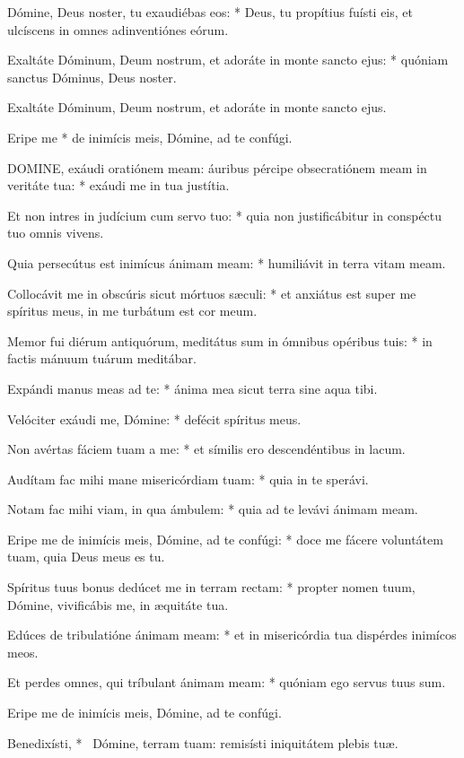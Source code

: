 Dómine, Deus noster, tu exaudiébas eos: * Deus, tu propítius fuísti eis, et ulcíscens in omnes adinventiónes eórum.

Exaltáte Dóminum, Deum nostrum, et adoráte in monte sancto ejus: * quóniam sanctus Dóminus, Deus noster.

 Exaltáte Dóminum, Deum nostrum, et adoráte in monte sancto ejus.

 Eripe me * de inimícis meis, Dómine, ad te confúgi.


\lettrine[lines=2]{D}{OMINE}, exáudi oratiónem meam: áuribus pércipe obsecratiónem meam in veritáte tua: * exáudi me in tua justítia.

Et non intres in judícium cum servo tuo: * quia non justificábitur in conspéctu tuo omnis vivens.

Quia persecútus est inimícus ánimam meam: * humiliávit in terra vitam meam.

Collocávit me in obscúris sicut mórtuos sæculi: * et anxiátus est super me spíritus meus, in me turbátum est cor meum.

Memor fui diérum antiquórum, meditátus sum in ómnibus opéribus tuis: * in factis mánuum tuárum meditábar.

Expándi manus meas ad te: * ánima mea sicut terra sine aqua tibi.

Velóciter exáudi me, Dómine: * defécit spíritus meus.

Non avértas fáciem tuam a me: * et símilis ero descendéntibus in lacum.

Audítam fac mihi mane misericórdiam tuam: * quia in te sperávi.

Notam fac mihi viam, in qua ámbulem: * quia ad te levávi ánimam meam.

Eripe me de inimícis meis, Dómine, ad te confúgi: * doce me fácere voluntátem tuam, quia Deus meus es tu.

Spíritus tuus bonus dedúcet me in terram rectam: * propter nomen tuum, Dómine, vivificábis me, in æquitáte tua.

Edúces de tribulatióne ánimam meam: * et in misericórdia tua dispérdes inimícos meos.

Et perdes omnes, qui tríbulant ánimam meam: * quóniam ego servus tuus sum.

 Eripe me de inimícis meis, Dómine, ad te confúgi.

 Benedixísti, * \textdagger\ Dómine, terram tuam: remisísti iniquitátem plebis tuæ.


